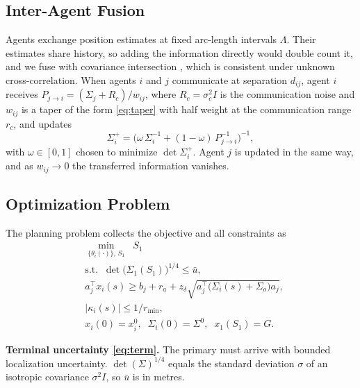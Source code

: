 \documentclass[letterpaper, 10 pt, conference]{ieeeconf}
\theoremstyle{remark}
\begin{document}
\subsection{Inter-Agent Fusion}

Agents exchange position estimates at fixed arc-length intervals $\Lambda$.
Their estimates share history, so adding the information directly would
double count it, and we fuse with covariance intersection
\cite{julier1997cov}, which is consistent under unknown cross-correlation.
When agents $i$ and $j$ communicate at separation $d_{ij}$, agent $i$
receives $P_{j \to i} = (\Sigma_j + R_c)/w_{ij}$, where $R_c = \sigma_c^2 I$
is the communication noise and $w_{ij}$ is a taper of the form
\eqref{eq:taper} with half weight at the communication range $r_c$, and
updates
\begin{equation}
  \Sigma_i^{+} = \Big( \omega\,\Sigma_i^{-1} + (1-\omega)\,P_{j \to i}^{-1} \Big)^{-1},
  \label{eq:ci}
\end{equation}
with $\omega \in [0,1]$ chosen to minimize $\det\Sigma_i^{+}$. Agent $j$ is
updated in the same way, and as $w_{ij} \to 0$ the transferred information
vanishes.

\subsection{Optimization Problem}

The planning problem collects the objective and all constraints as
\begin{subequations}
\label{eq:opt}
\begin{align}
  & \min_{\{\theta_i(\cdot)\},\, S_1}\;\; S_1 \nonumber \\
  & \mathrm{s.t.}\;\;
    \det\big(\Sigma_1(S_1)\big)^{1/4} \le \bar{u}, \label{eq:term} \\
  & a_j^{\top} x_i(s) \ge b_j + r_a
      + z_\delta \sqrt{a_j^{\top}\big(\Sigma_i(s) + \Sigma_o\big)a_j},
      \label{eq:cc} \\
  & |\kappa_i(s)| \le 1/r_{\min}, \label{eq:kin} \\
  & x_i(0) = x_i^0,\;\; \Sigma_i(0) = \Sigma^0,\;\; x_1(S_1) = G.
      \label{eq:bc}
\end{align}
\end{subequations}

\textbf{Terminal uncertainty \eqref{eq:term}.} The primary must arrive with
bounded localization uncertainty. $\det(\Sigma)^{1/4}$ equals the standard
deviation $\sigma$ of an isotropic covariance $\sigma^2 I$, so $\bar{u}$ is
in metres.
\end{document}
